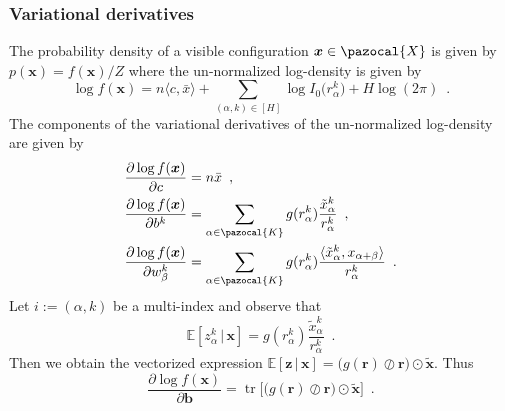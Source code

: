 \documentclass[12pt]{article}
\DeclareMathOperator{\tr}{tr}
\theoremstyle{definition}%
\theoremstyle{definition}
\theoremstyle{remark}
\begin{document}
\subsubsection{Variational derivatives}
The probability density of a visible configuration $\bm{x} \in \pazocal{X}$ is given by $p(\bm{x}) = f(\bm{x}) / Z$ where the un-normalized log-density is given by
\begin{equation}
	\log f(\bm{x}) = n \langle c,  \bar{x}\rangle + \sum_{(\alpha,k) \in [H]} \log I_0\big(r_\alpha^k\big) + H \log(2\pi) \enspace .
\end{equation}
The components of the variational derivatives of the un-normalized log-density are given by
\begin{align}
	\frac{\partial \log f(\bm{x})}{\partial c}
		& = n \bar{x} \enspace , \\
	\frac{\partial \log f(\bm{x})}{\partial b^k}
		& = \sum_{\alpha \in \pazocal{K}}g(r_\alpha^k) \frac{\tilde{x}_\alpha^k}{r_\alpha^k} \enspace , \\
	\frac{\partial \log f(\bm{x})}{\partial w_\beta^k}
		& = \sum_{\alpha \in \pazocal{K}} g(r_\alpha^k) \frac{\langle \tilde{x}_\alpha^k , x_{\alpha + \beta} \rangle}{r_\alpha^k} \enspace .
\end{align}
Let $i :=(\alpha, k)$ be a multi-index and observe that
\begin{equation}
	\mathbb{E}[ z_\alpha^k \, | \, \bm{x}] = g(r_\alpha^k)\frac{\tilde{x}_\alpha^k}{r_\alpha^k} \enspace .
\end{equation}
Then we obtain the vectorized expression $\mathbb{E}[\bm{z} \, | \, \bm{x}] = \big(g(\bm{r}) \oslash \bm{r} \big) \odot \tilde{\bm{x}}$. Thus
\begin{equation}
	\frac{\partial \log f(\bm{x})}{\partial \bm{b}} = \tr\big[\big(g(\bm{r}) \oslash \bm{r} \big) \odot \tilde{\bm{x}}\big] \enspace .
\end{equation}
\end{document}
